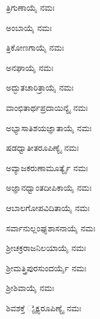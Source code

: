 ತ್ರಿಗುಣಾಯೈ ನಮಃ

ಅಂಬಾಯೈ ನಮಃ

ತ್ರಿಕೋಣಗಾಯೈ ನಮಃ

ಅನಘಾಯೈ ನಮಃ

ಅದ್ಭುತಚಾರಿತ್ರಾಯೈ ನಮಃ

ವಾಂಛಿತಾರ್ಥಪ್ರದಾಯಿನ್ಯೈ ನಮಃ

ಅಭ್ಯಾಸಾತಿಶಯಜ್ಞಾತಾಯೈ ನಮಃ

ಷಡಧ್ವಾತೀತರೂಪಿಣ್ಯೈ ನಮಃ

ಅವ್ಯಾಜಕರುಣಾಮೂರ್ತ್ಯೈ ನಮಃ

ಅಜ್ಞಾನಧ್ವಾಂತದೀಪಿಕಾಯೈ ನಮಃ

ಆಬಾಲಗೋಪವಿದಿತಾಯೈ ನಮಃ

ಸರ್ವಾನುಲ್ಲಂಘ್ಯಶಾಸನಾಯೈ ನಮಃ

ಶ್ರೀಚಕ್ರರಾಜನಿಲಯಾಯೈ ನಮಃ

ಶ್ರೀಮತ್ತ್ರಿಪುರಸುಂದರ್ಯೈ ನಮಃ

ಶ್ರೀಶಿವಾಯೈ ನಮಃ

ಶಿವಶಕ್ತೆ ್ಯೈಕ್ಯರೂಪಿಣ್ಯೈ ನಮಃ


